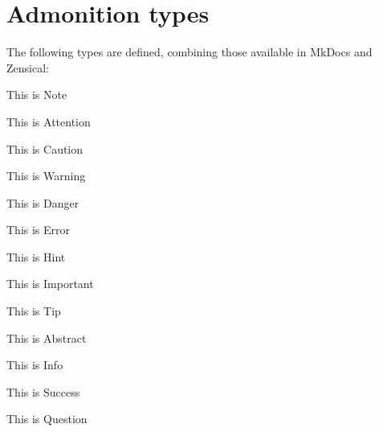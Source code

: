 \documentclass{scrartcl}
\begin{document}
\section{Admonition types}\label{sec:admonition_types}

The following types are defined, combining those available in MkDocs and
Zensical:

\begin{AdmonitionNote}
This is Note
\end{AdmonitionNote}

\begin{AdmonitionAttention}
This is Attention
\end{AdmonitionAttention}

\begin{AdmonitionCaution}
This is Caution
\end{AdmonitionCaution}

\begin{AdmonitionWarning}
This is Warning
\end{AdmonitionWarning}

\begin{AdmonitionDanger}
This is Danger
\end{AdmonitionDanger}

\begin{AdmonitionError}
This is Error
\end{AdmonitionError}

\begin{AdmonitionHint}
This is Hint
\end{AdmonitionHint}

\begin{AdmonitionImportant}
This is Important
\end{AdmonitionImportant}

\begin{AdmonitionTip}
This is Tip
\end{AdmonitionTip}

\begin{AdmonitionAbstract}
This is Abstract
\end{AdmonitionAbstract}

\begin{AdmonitionInfo}
This is Info
\end{AdmonitionInfo}

\begin{AdmonitionSuccess}
This is Success
\end{AdmonitionSuccess}

\begin{AdmonitionQuestion}
This is Question
\end{AdmonitionQuestion}
\end{document}
